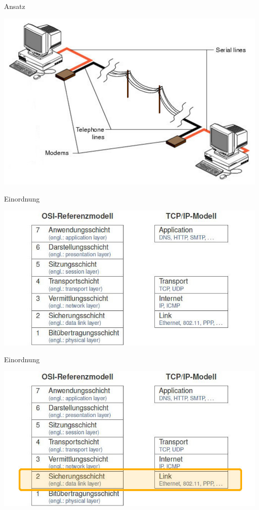 \documentclass[beamer]{uibk}
\begin{document}
\begin{frame}{Ansatz}
  \begin{center}
  \includegraphics[width=\textwidth,height=\textheight,keepaspectratio]{ansatz_4.jpg}
  \end{center}
\end{frame}

\begin{frame}{Einordnung}
  \begin{center}
  \includegraphics[width=\textwidth,height=\textheight,keepaspectratio]{layer.jpg}
  \end{center}
\end{frame}

\begin{frame}{Einordnung}
  \begin{center}
  \includegraphics[width=\textwidth,height=\textheight,keepaspectratio]{layer2.jpg}
  \end{center}
\end{frame}
\end{document}
